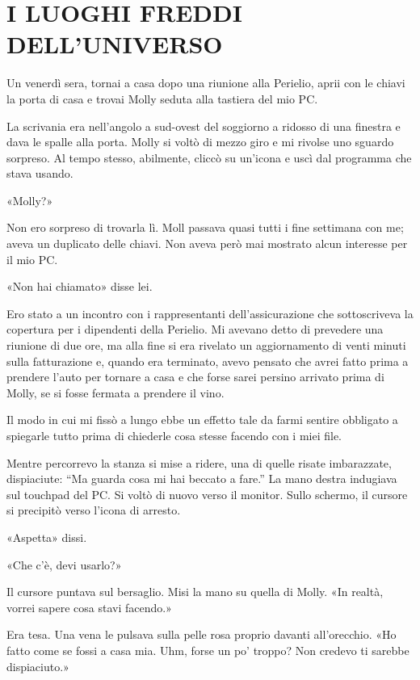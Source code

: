 \chapter{I LUOGHI FREDDI DELL'UNIVERSO}\label{i-luoghi-freddi-dell-universo}

\hfill\break

Un venerdì sera, tornai a casa dopo una riunione alla Perielio, aprii
con le chiavi la porta di casa e trovai Molly seduta alla tastiera del
mio PC.

La scrivania era nell'angolo a sud-ovest del soggiorno a ridosso di una
finestra e dava le spalle alla porta. Molly si voltò di mezzo giro e mi
rivolse uno sguardo sorpreso. Al tempo stesso, abilmente, cliccò su
un'icona e uscì dal programma che stava usando.

«Molly?»

Non ero sorpreso di trovarla lì. Moll passava quasi tutti i fine
settimana con me; aveva un duplicato delle chiavi. Non aveva però mai
mostrato alcun interesse per il mio PC.

«Non hai chiamato» disse lei.

Ero stato a un incontro con i rappresentanti dell'assicurazione che
sottoscriveva la copertura per i dipendenti della Perielio. Mi avevano
detto di prevedere una riunione di due ore, ma alla fine si era rivelato
un aggiornamento di venti minuti sulla fatturazione e, quando era
terminato, avevo pensato che avrei fatto prima a prendere l'auto per
tornare a casa e che forse sarei persino arrivato prima di Molly, se si
fosse fermata a prendere il vino.

Il modo in cui mi fissò a lungo ebbe un effetto tale da farmi sentire
obbligato a spiegarle tutto prima di chiederle cosa stesse facendo con i
miei file.

Mentre percorrevo la stanza si mise a ridere, una di quelle risate
imbarazzate, dispiaciute: ``Ma guarda cosa mi hai beccato a fare.'' La
mano destra indugiava sul touchpad del PC. Si voltò di nuovo verso il
monitor. Sullo schermo, il cursore si precipitò verso l'icona di
arresto.

«Aspetta» dissi.

«Che c'è, devi usarlo?»

Il cursore puntava sul bersaglio. Misi la mano su quella di Molly. «In
realtà, vorrei sapere cosa stavi facendo.»

Era tesa. Una vena le pulsava sulla pelle rosa proprio davanti
all'orecchio. «Ho fatto come se fossi a casa mia. Uhm, forse un po'
troppo? Non credevo ti sarebbe dispiaciuto.»

